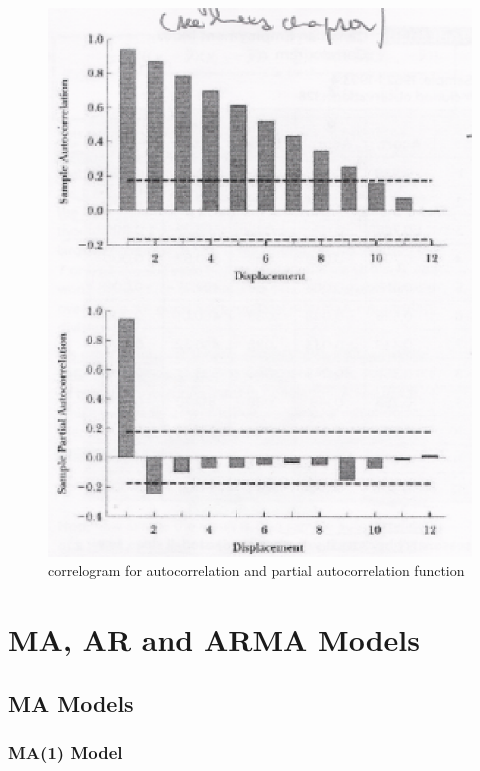 \begin{itemize}
\begin{figure}[htp]
\includegraphics[scale = 0.75]{correlogram.eps}
\caption{correlogram for autocorrelation and partial autocorrelation function}
\label{correlogram}
\end{figure}
\end{itemize}

\section{MA, AR and ARMA Models}

\subsection{MA Models}

\subsubsection{MA(1) Model}

